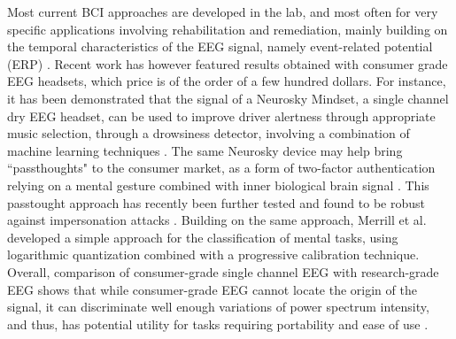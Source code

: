 Most current BCI approaches are developed in the lab, and most often for very specific applications involving rehabilitation and remediation, mainly building on the temporal characteristics of the EEG signal, namely event-related potential (ERP) \cite{brouwer2010tactile}. Recent work has however featured results obtained with consumer grade  EEG headsets, which price is of the order of a few hundred dollars. For instance, it has been demonstrated that the signal of a Neurosky Mindset, a single channel dry EEG headset, can be used to improve driver alertness through appropriate music selection, through a drowsiness detector, involving a combination of machine learning techniques \cite{liu2013driverAlertness}. The same Neurosky device may help bring ``passthoughts"  to the consumer market, as a form of two-factor authentication relying on a mental gesture combined with inner biological brain signal \cite{chuang2013ithink}. This passtought approach has recently been further tested and found to be robust against impersonation attacks \cite{jonhson2014mythoughts}. Building on the same approach, Merrill et al. \cite{merrill2015} developed a simple approach for the classification of mental tasks, using logarithmic quantization combined with a progressive calibration technique. Overall, comparison of consumer-grade single channel EEG with research-grade EEG shows that while consumer-grade EEG cannot locate the origin of the signal, it can discriminate well enough variations of power spectrum intensity, and thus, has potential utility for tasks requiring portability and ease of use \cite{johnstone2012eeg}.



